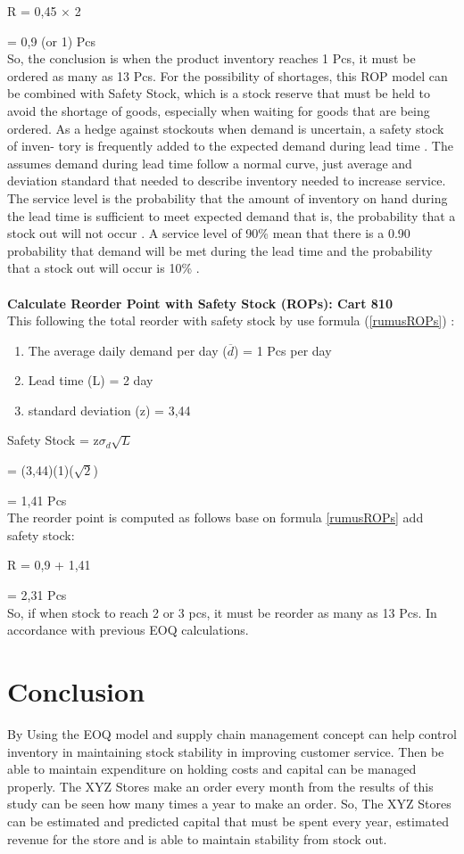 \documentclass[12pt,a4paper,final]{iopart}
\begin{document}
R = 0,45 $\times$ 2

= 0,9 (or 1) Pcs\\

So, the conclusion is when the product inventory reaches 1 Pcs, it must be ordered as many as 13 Pcs. For the possibility of shortages, this ROP model can be combined with Safety Stock, which is a stock reserve that must be held to avoid the shortage of goods, especially when waiting for goods that are being ordered. As a hedge against stockouts when demand is uncertain, a safety stock of inven- tory is frequently added to the expected demand during lead time \cite{Rusell2011}. The assumes demand during lead time follow a normal curve, just average and deviation standard that needed to describe inventory needed to increase service. The service level is the probability that the amount of inventory on hand during the lead time is sufficient to meet expected demand that is, the probability that a stock out will not occur \cite{Rusell2011}. A service level of 90\% mean that there is a 0.90 probability that demand will be met during the lead time and the probability that a stock out will occur is 10\% \cite{Rusell2011}.\\ \\
\textbf{Calculate Reorder Point with Safety Stock (ROPs): Cart 810}\\
This following the total reorder with safety stock by use formula (\ref{rumusROPs}) :

\begin{enumerate}[label=(\alph*)]
	\item The average daily demand per day ($\overline{d}$) = 1 Pcs per day
	\item Lead time (L) = 2 day
	\item standard deviation (z) = 3,44
\end{enumerate}

Safety Stock = z$\sigma_d\sqrt{L}$

= (3,44)(1)($\sqrt{2}$)

= 1,41 Pcs\\
The reorder point is computed as follows base on formula \ref{rumusROPs} add safety stock:

R = 0,9 + 1,41

= 2,31 Pcs\\
So, if when stock to reach 2 or 3 pcs, it must be reorder as many as 13 Pcs. In accordance with previous EOQ calculations.


\section{Conclusion}
By Using the EOQ model and supply chain management concept can help control inventory in maintaining stock stability in improving customer service. Then be able to maintain expenditure on holding costs and capital can be managed properly. The XYZ Stores make an order every month from the results of this study can be seen how many times a year to make an order. So, The XYZ Stores can be estimated and predicted capital that must be spent every year, estimated revenue for the store and is able to maintain stability from stock out.
\end{document}
